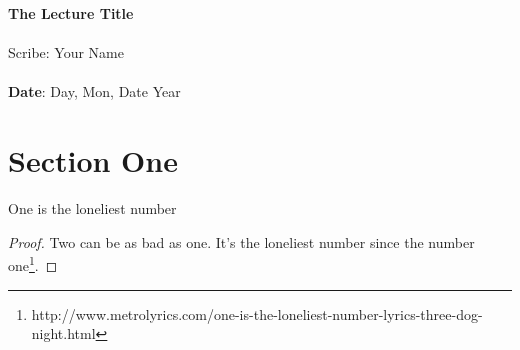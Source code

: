 \documentclass[11pt,twosided]{article}
\def\titlestring{The Lecture Title}
\def\scribestring{Your Name}
\def\datestring{Day, Mon, Date Year}
\begin{document}
\thispagestyle{plain}  %

\noindent
{\LARGE \textbf{\titlestring}}\\\\
%
{\Large Scribe: \scribestring}\\ \\
{\textbf{Date}: \datestring}


\noindent

\section{Section One}
\begin{theorem}
	One is the loneliest number
\end{theorem}
\begin{proof}
	Two can be as bad as one. It's the loneliest number since the number one\footnote{http://www.metrolyrics.com/one-is-the-loneliest-number-lyrics-three-dog-night.html}.
\end{proof}
\end{document}
